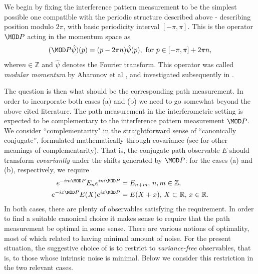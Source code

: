 We begin by fixing the interference pattern measurement to be the simplest possible one compatible with the periodic structure described above - describing position modulo $2\pi$, with basic periodicity interval $[-\pi,\pi]$. This is the operator $\MOD P$ acting in the momentum space as $$(\MOD P\hat\psi)(p) = (p-2\pi n)\hat\psi(p), \text{ for } p\in [-\pi,\pi] +2\pi n,$$ where$n\in \mathbb Z$ and $\hat \psi$ denotes the Fourier transform. This operator was called \emph{modular momentum} by Aharonov et al \cite{}, and investigated subsequently in \cite{}.

The question is then what should be the corresponding path measurement. In order to incorporate both cases (a) and (b) we need to go somewhat beyond the above cited literature. The path measurement in the interferometric setting is expected to be complementary to the interference pattern measurement $\MOD P$. We consider ``complementarity" in the straightforward sense of ``canonically conjugate'', formulated mathematically through covariance (see \cite{} for other meanings of complementarity). That is, the conjugate path observable $E$ should transform \emph{covariantly} under the shifts generated by $\MOD P$: for the cases (a) and (b), respectively, we require
\begin{align}
e^{-im \MOD P}E_ne^{im \MOD P} &= E_{n+m}, \,n,m\in \mathbb Z, \label{covA}\\
e^{-ix \MOD P}E(X)e^{ix \MOD P} &= E(X+x), \,X\subset \mathbb R,\,x\in \mathbb R. \label{covB}
\end{align}
In both cases, there are plenty of observables satisfying the requirement. In order to find a suitable canonical choice it makes sense to require that the path measurement be optimal in some sense. There are various notions of optimality, most of which related to having minimal amount of noise. For the present situation, the suggestive choice of is to restrict to \emph{variance-free} observables, that is, to those whose intrinsic noise is minimal. Below we consider this restriction in the two relevant cases.





